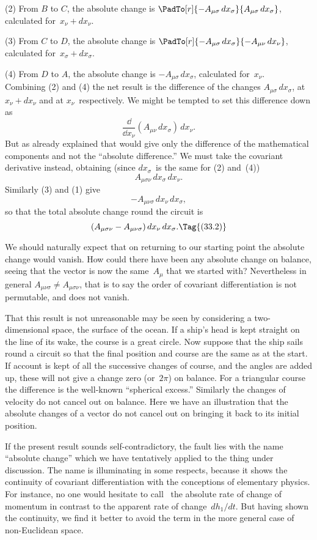 \documentclass[12pt]{book}
\begin{document}
(2) From $B$ to $C$, the absolute change is $\PadTo[r]{-A_{\mu\sigma}\, dx_{\sigma}}{A_{\mu\sigma}\, dx_{\sigma}}$, calculated for~$x_{\nu} + dx_{\nu}$.

(3) From $C$ to $D$, the absolute change is $\PadTo[r]{-A_{\mu\sigma}\, dx_{\sigma}}{-A_{\mu\nu}\, dx_{\nu}}$, calculated for~$x_{\sigma} + dx_{\sigma}$.

(4) From $D$ to $A$, the absolute change is $-A_{\mu\sigma}\, dx_{\sigma}$, calculated for~$x_{\nu}$. \\
Combining (2) and (4) the net result is the difference of the changes $A_{\mu\sigma}\, dx_{\sigma}$,
at $x_{\nu} + dx_{\nu}$ and at $x_{\nu}$~respectively. We might be tempted to set this difference
down as
\[
\frac{\dd}{\dd x_{\nu}} (A_{\mu\nu}\, dx_{\sigma})\, dx_{\nu}.
\]
But as already explained that would give only the difference of the mathematical
components and not the ``absolute difference.'' We must take the
covariant derivative instead, obtaining (since $dx_{\sigma}$~is the same for (2) and~(4))
\[
A_{\mu\sigma\nu}\, dx_{\sigma}\, dx_{\nu}.
\]
Similarly (3) and (1) give
\[
-A_{\mu\nu\sigma}\, dx_{\nu}\, dx_{\sigma},
\]
so that the total absolute change round the circuit is
\[
(A_{\mu\sigma\nu} - A_{\mu\nu\sigma})\, dx_{\nu}\, dx_{\sigma}.
\Tag{(33.2)}
\]

We should naturally expect that on returning to our starting point the
absolute change would vanish. How could there have been any absolute change
on balance, seeing that the vector is now the same~$A_{\mu}$ that we started with?
Nevertheless in general $A_{\mu\nu\sigma} \neq A_{\mu\sigma\nu}$, that is to say the order of covariant
differentiation is not permutable, and  does not vanish.

That this result is not unreasonable may be seen by considering a two\hyp{}dimensional
space, the surface of the ocean. If a ship's head is kept straight
on the line of its wake, the course is a great circle. Now suppose that the ship
sails round a circuit so that the final position and course are the same as at
the start. If account is kept of all the successive changes of course, and the
angles are added up, these will not give a change zero (or~$2\pi$) on balance. For
a triangular course the difference is the well-known ``spherical excess.'' Similarly
the changes of velocity do not cancel out on balance. Here we have an
illustration that the absolute changes of a vector do not cancel out on bringing
it back to its initial position.

If the present result sounds self\hyp{}contradictory, the fault lies with the name
``absolute change'' which we have tentatively applied to the thing under discussion.
The name is illuminating in some respects, because it shows the
continuity of covariant differentiation with the conceptions of elementary
physics. For instance, no one would hesitate to call~ the absolute rate
of change of momentum in contrast to the apparent rate of change~$dh_{1}/dt$. But
having shown the continuity, we find it better to avoid the term in the more
general case of non\hyp{}Euclidean space.
\end{document}

